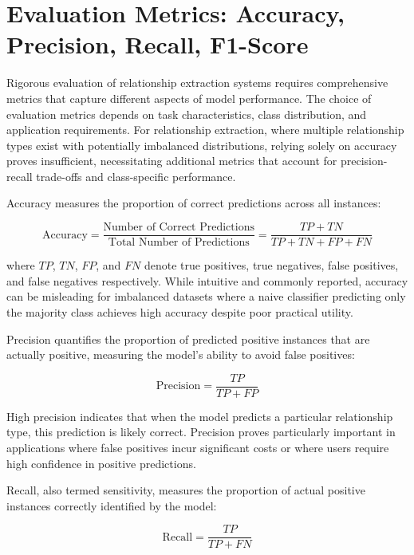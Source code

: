 \documentclass[12pt,a4paper]{report}
\begin{document}
\section{Evaluation Metrics: Accuracy, Precision, Recall, F1-Score}

Rigorous evaluation of relationship extraction systems requires comprehensive metrics that capture different aspects of model performance. The choice of evaluation metrics depends on task characteristics, class distribution, and application requirements. For relationship extraction, where multiple relationship types exist with potentially imbalanced distributions, relying solely on accuracy proves insufficient, necessitating additional metrics that account for precision-recall trade-offs and class-specific performance.

Accuracy measures the proportion of correct predictions across all instances:

\begin{equation}
\text{Accuracy} = \frac{\text{Number of Correct Predictions}}{\text{Total Number of Predictions}} = \frac{TP + TN}{TP + TN + FP + FN}
\end{equation}

where $TP$, $TN$, $FP$, and $FN$ denote true positives, true negatives, false positives, and false negatives respectively. While intuitive and commonly reported, accuracy can be misleading for imbalanced datasets where a naive classifier predicting only the majority class achieves high accuracy despite poor practical utility.

Precision quantifies the proportion of predicted positive instances that are actually positive, measuring the model's ability to avoid false positives:

\begin{equation}
\text{Precision} = \frac{TP}{TP + FP}
\end{equation}

High precision indicates that when the model predicts a particular relationship type, this prediction is likely correct. Precision proves particularly important in applications where false positives incur significant costs or where users require high confidence in positive predictions.

Recall, also termed sensitivity, measures the proportion of actual positive instances correctly identified by the model:

\begin{equation}
\text{Recall} = \frac{TP}{TP + FN}
\end{equation}
\end{document}
